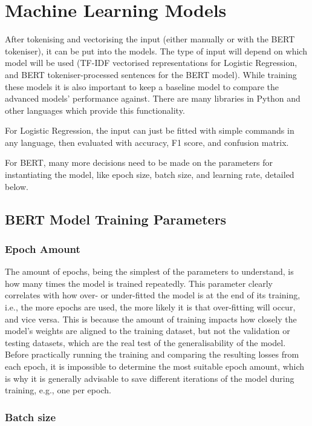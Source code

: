 \documentclass{l4proj}
\begin{document}
\section{Machine Learning Models}
\label{sec:design_ML}

After tokenising and vectorising the input (either manually or with the BERT tokeniser), it can be put into the models. The type of input will depend on which model will be used (TF-IDF vectorised representations for Logistic Regression, and BERT tokeniser-processed sentences for the BERT model). While training these models it is also important to keep a baseline model to compare the advanced models' performance against. There are many libraries in Python and other languages which provide this functionality.

For Logistic Regression, the input can just be fitted with simple commands in any language, then evaluated with accuracy, F1 score, and confusion matrix.

For BERT, many more decisions need to be made on the parameters for instantiating the model, like epoch size, batch size, and learning rate, detailed below.

\subsection{BERT Model Training Parameters}

\subsubsection{Epoch Amount}
\label{sec:epoch_amount_param}

The amount of epochs, being the simplest of the parameters to understand, is how many times the model is trained repeatedly. This parameter clearly correlates with how over- or under-fitted the model is at the end of its training, i.e., the more epochs are used, the more likely it is that over-fitting will occur, and vice versa. This is because the amount of training impacts how closely the model's weights are aligned to the training dataset, but not the validation or testing datasets, which are the real test of the generalisability of the model. Before practically running the training and comparing the resulting losses from each epoch, it is impossible to determine the most suitable epoch amount, which is why it is generally advisable to save different iterations of the model during training, e.g., one per epoch.

\subsubsection{Batch size}
\end{document}
